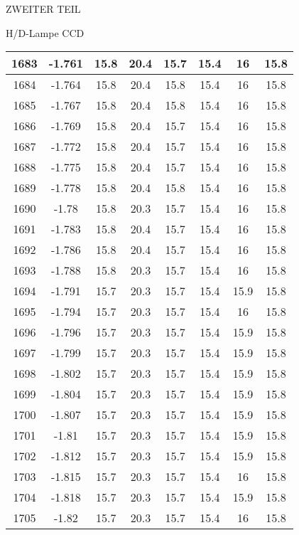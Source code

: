 \begin{appendix}
\begin{chapter}{ZWEITER TEIL}
\begin{section}{H/D-Lampe CCD}
\begin{scriptsize}
\begin{longtable}[htbp]{|c|c|c|c|c|c|c|c|}
            1683 & -1.761 & 15.8 & 20.4 & 15.7 & 15.4 & 16 & 15.8 \\ \hline
            1684 & -1.764 & 15.8 & 20.4 & 15.8 & 15.4 & 16 & 15.8 \\ \hline
            1685 & -1.767 & 15.8 & 20.4 & 15.8 & 15.4 & 16 & 15.8 \\ \hline
            1686 & -1.769 & 15.8 & 20.4 & 15.7 & 15.4 & 16 & 15.8 \\ \hline
            1687 & -1.772 & 15.8 & 20.4 & 15.7 & 15.4 & 16 & 15.8 \\ \hline
            1688 & -1.775 & 15.8 & 20.4 & 15.7 & 15.4 & 16 & 15.8 \\ \hline
            1689 & -1.778 & 15.8 & 20.4 & 15.8 & 15.4 & 16 & 15.8 \\ \hline
            1690 & -1.78 & 15.8 & 20.3 & 15.7 & 15.4 & 16 & 15.8 \\ \hline
            1691 & -1.783 & 15.8 & 20.4 & 15.7 & 15.4 & 16 & 15.8 \\ \hline
            1692 & -1.786 & 15.8 & 20.4 & 15.7 & 15.4 & 16 & 15.8 \\ \hline
            1693 & -1.788 & 15.8 & 20.3 & 15.7 & 15.4 & 16 & 15.8 \\ \hline
            1694 & -1.791 & 15.7 & 20.3 & 15.7 & 15.4 & 15.9 & 15.8 \\ \hline
            1695 & -1.794 & 15.7 & 20.3 & 15.7 & 15.4 & 16 & 15.8 \\ \hline
            1696 & -1.796 & 15.7 & 20.3 & 15.7 & 15.4 & 15.9 & 15.8 \\ \hline
            1697 & -1.799 & 15.7 & 20.3 & 15.7 & 15.4 & 15.9 & 15.8 \\ \hline
            1698 & -1.802 & 15.7 & 20.3 & 15.7 & 15.4 & 15.9 & 15.8 \\ \hline
            1699 & -1.804 & 15.7 & 20.3 & 15.7 & 15.4 & 15.9 & 15.8 \\ \hline
            1700 & -1.807 & 15.7 & 20.3 & 15.7 & 15.4 & 15.9 & 15.8 \\ \hline
            1701 & -1.81 & 15.7 & 20.3 & 15.7 & 15.4 & 15.9 & 15.8 \\ \hline
            1702 & -1.812 & 15.7 & 20.3 & 15.7 & 15.4 & 15.9 & 15.8 \\ \hline
            1703 & -1.815 & 15.7 & 20.3 & 15.7 & 15.4 & 16 & 15.8 \\ \hline
            1704 & -1.818 & 15.7 & 20.3 & 15.7 & 15.4 & 15.9 & 15.8 \\ \hline
            1705 & -1.82 & 15.7 & 20.3 & 15.7 & 15.4 & 16 & 15.8 \\ \hline

\end{longtable}
\end{scriptsize}
\end{section}
\end{chapter}
\end{appendix}
